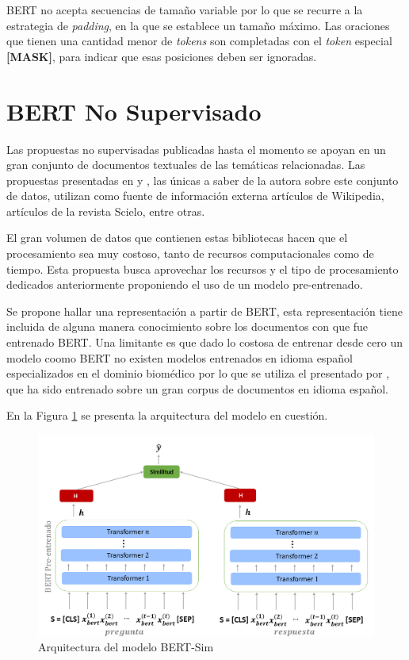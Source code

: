BERT no acepta secuencias de tamaño variable por lo que se recurre a la estrategia de \textit{padding}, en la que se establece un tamaño máximo. Las oraciones que tienen una cantidad menor de \textit{tokens} son completadas con el \textit{token} especial \textbf{[MASK]}, para indicar que esas posiciones deben ser ignoradas.

\section{BERT No Supervisado}

Las propuestas no supervisadas publicadas hasta el momento se apoyan en un gran conjunto de documentos textuales de las temáticas relacionadas. Las propuestas presentadas en \cite{2019-head-qa} y \cite{2020-multi-step}, las únicas a saber de la autora sobre este conjunto de datos, utilizan como fuente de información externa artículos de Wikipedia, artículos de la revista Scielo, entre otras. 

El gran volumen de datos que contienen estas bibliotecas hacen que el procesamiento sea muy costoso, tanto de recursos computacionales como de tiempo. Esta propuesta busca aprovechar los recursos y el tipo de procesamiento dedicados anteriormente proponiendo el uso de un modelo pre-entrenado. 

Se propone hallar una representación a partir de BERT, esta representación tiene incluida de alguna manera conocimiento sobre los documentos con que fue entrenado BERT. Una limitante es que dado lo costosa de entrenar desde cero un modelo coomo BERT no existen modelos entrenados en idioma español especializados en el dominio biomédico por lo que se utiliza el presentado por \cite{2020-spanish-bert}, que ha sido entrenado sobre un gran corpus de documentos en idioma español.

En la Figura \ref{bert_sim} se presenta la arquitectura del modelo en cuestión.

\begin{figure}[!tb]
  \begin{center}
    \includegraphics[angle=0, width=1\textwidth]{Graphics/bert_sim.png}
  \end{center}
    \caption{Arquitectura del modelo BERT-Sim}\label{bert_sim}
\end{figure}

